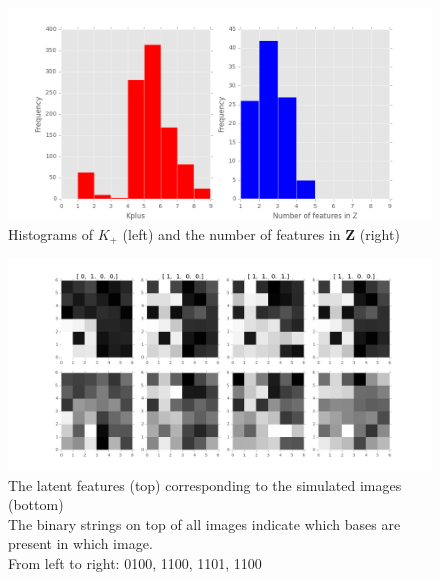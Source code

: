 \begin{figure}[!ht]
\centering
    \includegraphics[width=0.8\linewidth]{Reverse/IBP_Histograms.png}
    \caption{Histograms of $K_+$ (left) and the number of features in $\mathbf{Z}$ (right)}
    \label{fig:hist}
\end{figure}

\begin{figure}[!ht]
\centering
    \includegraphics[width=\linewidth]{Reverse/IBP_Reverse_Images.png}
    \caption{The latent features (top) corresponding to the simulated images (bottom)\\
    The binary strings on top of all images indicate which bases are present in which image.\\
    From left to right: 0100, 1100, 1101, 1100}
    \label{fig:reverse}
\end{figure}
